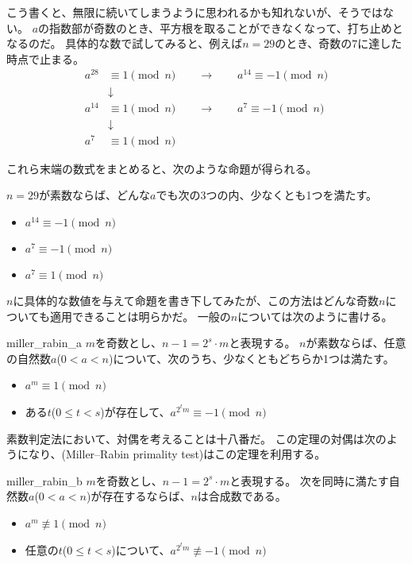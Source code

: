 こう書くと、無限に続いてしまうように思われるかも知れないが、そうではない。
$a$の指数部が奇数のとき、平方根を取ることができなくなって、打ち止めとなるのだ。
具体的な数で試してみると、例えば$n=29$のとき、奇数の$7$に達した時点で止まる。
\begin{align*}
a^{28} &\equiv 1 \pmod{n} \qquad\to\qquad a^{14} \equiv -1 \pmod{n}\\
&\downarrow \\
a^{14} &\equiv 1 \pmod{n} \qquad\to\qquad a^{7} \equiv -1 \pmod{n} \\
&\downarrow \\
a^{7} &\equiv 1 \pmod{n}
\end{align*}

これら末端の数式をまとめると、次のような命題が得られる。
\begin{Prop}{}{}
$n=29$が素数ならば、どんな$a$でも次の3つの内、少なくとも1つを満たす。
\begin{itemize}
\item $a^{14} \equiv -1 \pmod{n}$
\item $a^{7} \equiv -1 \pmod{n}$
\item $a^{7} \equiv 1 \pmod{n}$
\end{itemize}
\end{Prop}

$n$に具体的な数値を与えて命題を書き下してみたが、この方法はどんな奇数$n$についても適用できることは明らかだ。
一般の$n$については次のように書ける。

\begin{Theo}{}{miller_rabin_a}
$m$を奇数とし、$n-1 = 2^s \cdot m$と表現する。
$n$が素数ならば、任意の自然数$a$($0<a<n$)について、次のうち、少なくともどちらか1つは満たす。
\begin{itemize}
\item $a^m \equiv 1 \pmod{n}$
\item ある$t$($0\le t<s$)が存在して、$a^{2^tm} \equiv -1 \pmod{n}$
\end{itemize}
\end{Theo}

素数判定法において、対偶を考えることは十八番だ。
この定理の対偶は次のようになり、(Miller–Rabin primality test)はこの定理を利用する。

\begin{Theo}{}{miller_rabin_b}
$m$を奇数とし、$n-1 = 2^s \cdot m$と表現する。
次を同時に満たす自然数$a$($0<a<n$)が存在するならば、$n$は合成数である。
\begin{itemize}
\item $a^m \not\equiv 1 \pmod{n}$
\item 任意の$t$($0\le t<s$)について、$a^{2^tm} \not\equiv -1 \pmod{n}$
\end{itemize}
\end{Theo}


